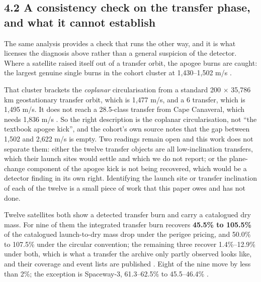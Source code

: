\documentclass[11pt]{article}
\begin{document}
\subsection*{4.2 A consistency check on the transfer phase, and what it cannot establish}

The same analysis provides a check that runs the other way, and it is what licenses the diagnosis above rather than a general suspicion of the detector. Where a satellite raised itself out of a transfer orbit, the apogee burns are caught: the largest genuine single burns in the cohort cluster at 1,430--1,502 m/s%
.

That cluster brackets the \emph{coplanar} circularisation from a standard 200 $\times$ 35,786 km geostationary transfer orbit, which is 1,477 m/s, and a 6\textdegree{} transfer, which is 1,495 m/s. It does not reach a 28.5\textdegree{}-class transfer from Cape Canaveral, which needs 1,836 m/s%
. So the right description is the coplanar circularisation, not ``the textbook apogee kick'', and the cohort's own source notes that the gap between 1,502 and 2,622 m/s is empty. Two readings remain open and this work does not separate them: either the twelve transfer objects are all low-inclination transfers, which their launch sites would settle and which we do not report; or the plane-change component of the apogee kick is not being recovered, which would be a detector finding in its own right. Identifying the launch site or transfer inclination of each of the twelve is a small piece of work that this paper owes and has not done.

Twelve satellites both show a detected transfer burn and carry a catalogued dry mass. For nine of them the integrated transfer burn recovers \textbf{45.5\% to 105.5\%} of the catalogued launch-to-dry mass drop under the perigee pricing, and 50.0\% to 107.5\% under the circular convention; the remaining three recover 1.4\%--12.9\% under both, which is what a transfer the archive only partly observed looks like, and their coverage and event lists are published%
. Eight of the nine move by less than 2\%; the exception is Spaceway-3, 61.3--62.5\% to 45.5--46.4\%%
.
\end{document}
